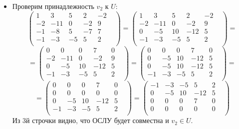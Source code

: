 \documentclass[a4paper,12pt]{article}
\begin{document}
\begin{itemize}
\item
Проверим принадлежность $v_2$ к $U$:
\[
\begin{pmatrix}
1 & 3 & 5 & 2 & -2 & \\
-2 & -11 & 0 & -2 & 9 & \\
-1 & -8 & 5 & -7 & 7 & \\
-1 & -3 & -5 & 5 & 2 & \\
\end{pmatrix}
=
\begin{pmatrix}
1 & 3 & 5 & 2 & -2 & \\
-2 & -11 & 0 & -2 & 9 & \\
0 & -5 & 10 & -12 & 5 & \\
-1 & -3 & -5 & 5 & 2 & \\
\end{pmatrix}
=
\]
\[
=
\begin{pmatrix}
0 & 0 & 0 & 7 & 0 & \\
-2 & -11 & 0 & -2 & 9 & \\
0 & -5 & 10 & -12 & 5 & \\
-1 & -3 & -5 & 5 & 2 & \\
\end{pmatrix}
=
\begin{pmatrix}
0 & 0 & 0 & 7 & 0 & \\
0 & -5 & 10 & -12 & 5 & \\
0 & -5 & 10 & -12 & 5 & \\
-1 & -3 & -5 & 5 & 2 & \\
\end{pmatrix}
=
\]
\[
=
\begin{pmatrix}
0 & 0 & 0 & 7 & 0 & \\
0 & 0 & 0 & 0 & 0 & \\
0 & -5 & 10 & -12 & 5 & \\
-1 & -3 & -5 & 5 & 2 & \\
\end{pmatrix}
=
\begin{pmatrix}
-1 & -3 & -5 & 5 & 2 & \\
0 & -5 & 10 & -12 & 5 & \\
0 & 0 & 0 & 7 & 0 & \\
0 & 0 & 0 & 0 & 0 & \\
\end{pmatrix}
\]
Из 3й строчки видно, что ОСЛУ будет совместна и $v_2 \in U$.


\end{itemize}
\end{document}
